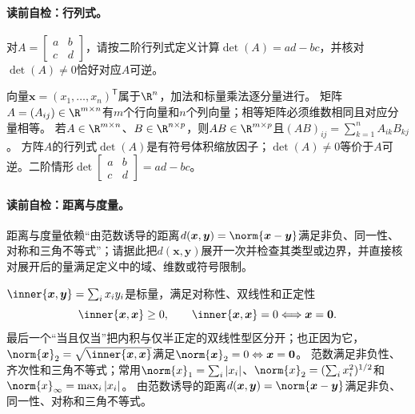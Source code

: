 \paragraph{读前自检：行列式。}对$A=\begin{bmatrix}a&b\\c&d\end{bmatrix}$，请按二阶行列式定义计算$\det(A)=ad-bc$，并核对$\det(A)\ne0$恰好对应$A$可逆。\par

向量$\boldsymbol{x}=(x_1,\ldots,x_n)^{\mathsf T}$属于$\R^n$，加法和标量乘法逐分量进行。
矩阵$A=(A_{ij})\in\R^{m\times n}$有$m$个行向量和$n$个列向量；相等矩阵必须维数相同且对应分量相等。
若$A\in\R^{m\times n}$、$B\in\R^{n\times p}$，则$AB\in\R^{m\times p}$且$(AB)_{ij}=\sum_{k=1}^{n}A_{ik}B_{kj}$。
方阵$A$的行列式$\det(A)$是有符号体积缩放因子；$\det(A)\ne0$等价于$A$可逆。二阶情形$\det\begin{bmatrix}a&b\\c&d\end{bmatrix}=ad-bc$。


\paragraph{读前自检：距离与度量。}距离与度量依赖“由范数诱导的距离$d(\boldsymbol{x},\boldsymbol{y})=\norm{\boldsymbol{x}-\boldsymbol{y}}$满足非负、同一性、对称和三角不等式”；请据此把$d(\boldsymbol{x},\boldsymbol{y})$展开一次并检查其类型或边界，并直接核对展开后的量满足定义中的域、维数或符号限制。\par

$\inner{\boldsymbol{x},\boldsymbol{y}}=\sum_i x_i y_i$是标量，满足对称性、双线性和正定性
\[
\inner{\boldsymbol{x},\boldsymbol{x}}\ge0,
\qquad
\inner{\boldsymbol{x},\boldsymbol{x}}=0
\Longleftrightarrow \boldsymbol{x}=\boldsymbol0.
\]
最后一个“当且仅当”把内积与仅半正定的双线性型区分开；也正因为它，$\norm{\boldsymbol{x}}_2=\sqrt{\inner{\boldsymbol{x},\boldsymbol{x}}}$满足$\norm{\boldsymbol{x}}_2=0\Leftrightarrow\boldsymbol{x}=\boldsymbol0$。
范数满足非负性、齐次性和三角不等式；常用$\norm{x}_1=\sum_i|x_i|$、$\norm{x}_2=(\sum_i x_i^2)^{1/2}$和$\norm{x}_{\infty}=\max_i|x_i|$。
由范数诱导的距离$d(\boldsymbol{x},\boldsymbol{y})=\norm{\boldsymbol{x}-\boldsymbol{y}}$满足非负、同一性、对称和三角不等式。
